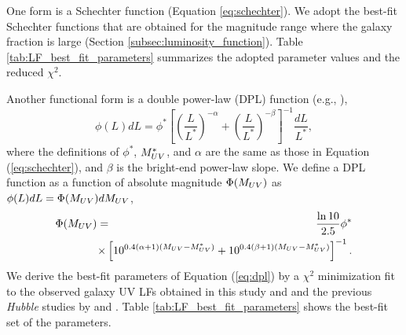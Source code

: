 \documentclass[]{pasj01}
\begin{document}
One form is a Schechter function (Equation \ref{eq:schechter}). 
%
We adopt the best-fit Schechter functions 
that are obtained for the magnitude range where the galaxy fraction is large 
(Section \ref{subsec:luminosity_function}).  
Table \ref{tab:LF_best_fit_parameters} 
summarizes the adopted parameter values and the reduced $\chi^2$. 



Another functional form is a double power-law (DPL) function 
(e.g., \cite{2012MNRAS.426.2772B}), 
\begin{equation}
\phi(L) dL 
= \phi^\ast \left[ \left( \frac{L}{L^\ast} \right)^{-\alpha} + \left( \frac{L}{L^\ast} \right)^{-\beta}   \right]^{-1} \frac{dL}{L^\ast}, 
\end{equation}
where 
the definitions of 
$\phi^\ast$, $M^\ast_{\rm UV}$, and $\alpha$ are 
the same as those in Equation (\ref{eq:schechter}), 
and $\beta$ is the bright-end power-law slope. 
We define a DPL function 
as a function of absolute magnitude 
$\Phi (M_{\rm UV})$ as 
$\phi(L)dL = \Phi (M_{\rm UV}) dM_{\rm UV}$, 
\begin{eqnarray}
\Phi(M_{\rm UV}) 
	&=& \frac{\ln 10}{2.5} \phi^\ast \nonumber \\
	&& \hspace{-2em} \times \left[10^{0.4(\alpha+1)(M_{\rm UV} - M_{\rm UV}^\ast)} + 10^{0.4(\beta+1)(M_{\rm UV} - M_{\rm UV}^\ast)} \right]^{-1}. 
\label{eq:dpl}
\end{eqnarray} 
We derive the best-fit parameters of Equation (\ref{eq:dpl}) 
by a $\chi^2$ minimization fit to the observed galaxy UV LFs 
obtained in this study and  and the previous \textit{Hubble} studies by 
\citet{2015ApJ...803...34B} and \citet{2017arXiv170204867I}. 
Table \ref{tab:LF_best_fit_parameters} shows 
the best-fit set of the parameters. 
\end{document}
